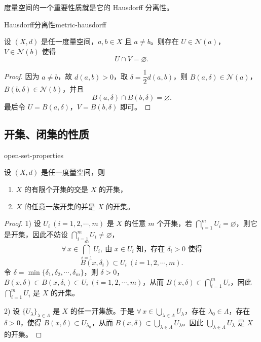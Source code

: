 度量空间的一个重要性质就是它的 Hausdorff 分离性。

\begin{mythm}{Hausdorff分离性}{metric-hausdorff}

设 $(X,d)$ 是任一度量空间，$a,b\in X$ 且 $a\neq b$。则存在 $U\in\mathscr{N}(a)$，$V\in\mathscr{N}(b)$ 使得
\[U\cap V=\varnothing.\]

\end{mythm}

\begin{proof}

因为 $a\neq b$，故 $d(a,b)>0$，取 $\delta=\dfrac12d(a,b)$，则 $B(a,\delta)\in\mathscr{N}(a)$，$B(b,\delta)\in\mathscr{N}(b)$，并且
\[B(a,\delta)\cap B(b,\delta)=\varnothing.\]
最后令 $U=B(a,\delta)$，$V=B(b,\delta)$ 即可。

\end{proof}

\subsection*{开集、闭集的性质}

\begin{mythm}{}{open-set-properties}

设 $(X,d)$ 是任一度量空间，则
\begin{enumerate}[label=\arabic{enumi})]
\item $X$ 的有限个开集的交是 $X$ 的开集，
\item $X$ 的任意一族开集的并是 $X$ 的开集。
\end{enumerate}

\end{mythm}

\begin{proof}

1) 设 $U_i\ (i=1,2,\cdots,m)$ 是 $X$ 的任意 $m$ 个开集，若 $\displaystyle\bigcap_{i=1}^mU_i=\varnothing$，则它是开集，因此不妨设 $\displaystyle\bigcap_{i=1}^mU_i\neq\varnothing$，
\[\forall\,x\in\bigcap_{i=1}^mU_i,\ \text{由 }x\in U_i\text{ 知，存在 }\delta_i>0\text{ 使得}\]
\[B(x,\delta_i)\subset U_i\ (i=1,2,\cdots,m).\]
令 $\delta=\min\{\delta_1,\delta_2,\cdots,\delta_m\}$，则 $\delta>0$，$B(x,\delta)\subset B(x,\delta_i)\subset U_i\ (i=1,2,\cdots,m)$，从而 $B(x,\delta)\subset\displaystyle\bigcap_{i=1}^mU_i$，因此 $\displaystyle\bigcap_{i=1}^mU_i$ 是 $X$ 的开集。

2) 设 $\{U_{\lambda}\}_{\lambda\in\Lambda}$ 是 $X$ 的任一开集族。于是 $\forall\,x\in\displaystyle\bigcup_{\lambda\in\Lambda}U_{\lambda}$，存在 $\lambda_0\in\Lambda$，存在 $\delta>0$，使得 $B(x,\delta)\subset U_{\lambda_0}$，从而 $B(x,\delta)\subset\displaystyle\bigcup_{\lambda\in\Lambda}U_{\lambda}$。因此 $\displaystyle\bigcup_{\lambda\in\Lambda}U_{\lambda}$ 是 $X$ 的开集。

\end{proof}

